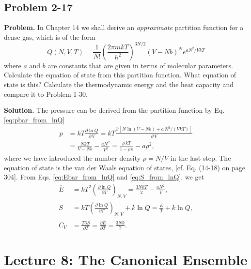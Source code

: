 \documentclass[twocolumn, 10pt]{article}
\numberwithin{equation}{section}
\newenvironment{problem}
{\par\medskip\sffamily \color{problue}
  \textbf{Problem. }\ignorespaces}
{\medskip}
\newenvironment{solution}
{\par\medskip
  \textbf{Solution. }\ignorespaces}
{\medskip}
\begin{document}
\subsection{Problem 2-17}

\begin{problem}
In Chapter 14 we shall derive an \emph{approximate}
partition function for a dense gas,
which is of the form
$$
  Q(N, V, T)
  =
  \frac{1}{N!}
  \left( \frac{ 2\pi m k T }{ h^2 } \right)^{3N/2}
  (V - N b)^N e^{a N^2/V k T}
$$
where $a$ and $b$ are constants that are given
in terms of molecular parameters.
%
Calculate the equation of state from this partition function.
%
What equation of state is this?
%
Calculate the thermodynamic energy and the heat capacity
and compare it to Problem 1-30.
\end{problem}

\begin{solution}
The pressure can be derived from the partition function
by Eq. \eqref{eq:pbar_from_lnQ}
%
\begin{align*}
p &=
  kT \frac{ \partial \ln Q } { \partial \, V }
=
  kT \frac{ \partial \, [ N \ln (V - N b)
   + a \, N^2 / (V k T)] }
  { \partial \, V }
\\
&=
  \frac{ N k T } { V - N b} - \frac{ a N^2 }{ V^2 }
=
  \frac{ \rho \, k T } { 1 - \rho \, b} - a \rho^2
,
\end{align*}
%
where we have introduced
the number density $\rho = N/V$ in the last step.
%
The equation of state is the van der Waals equation of states,
  [cf. Eq. (14-18) on page 304].
%
From Eqs. \eqref{eq:Ebar_from_lnQ} and \eqref{eq:S_from_lnQ},
we get
\begin{align*}
\overline E
&=
    kT^2 \left(
      \frac{ \partial \ln Q }
           { \partial T }
    \right)_{N, V}
=
  \frac{ 3 N k T }{2}
  -\frac{ a N^2 } { V}
,
\\
S
&=
    kT \left(
      \frac{ \partial \ln Q }
           { \partial T }
    \right)_{N, V}
    + k \ln Q
=
  \frac{ \overline E } { T }
  + k \ln Q
,
\\
C_V
&=
\frac{ T \partial S } { \partial T }
=
\frac{ \partial \overline E } { \partial T }
= \frac{ 3 N k}{2}
.
\end{align*}
\end{solution}

\section{Lecture 8: The Canonical Ensemble}
\end{document}
